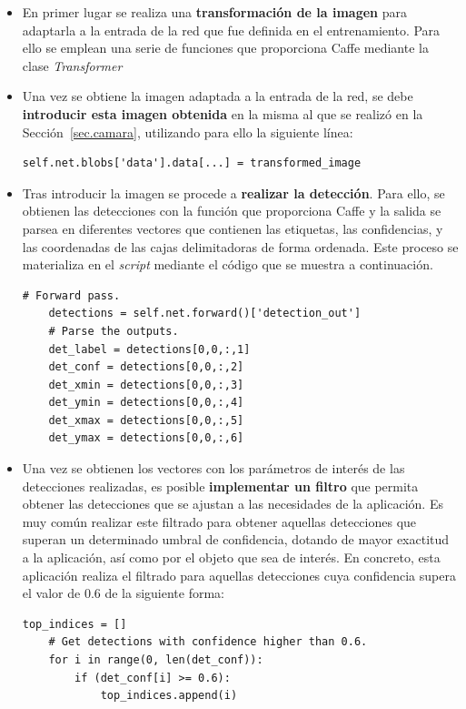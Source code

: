 \begin{itemize}
	\item En primer lugar se realiza una \textbf{transformación de la imagen} para adaptarla a la entrada de la red que fue definida en el entrenamiento. Para ello se emplean una serie de funciones que proporciona Caffe mediante la clase \textit{Transformer} 
	\item Una vez se obtiene la imagen adaptada a la entrada de la red, se debe \textbf{introducir esta imagen obtenida} en la misma al que se realizó en la Sección~\ref{sec.camara}, utilizando para ello la siguiente línea:
	\vspace{10pt}
	\begin{lstlisting}[frame=single]
	self.net.blobs['data'].data[...] = transformed_image
	\end{lstlisting}
	\item Tras introducir la imagen se procede a \textbf{realizar la detección}. Para ello, se obtienen las detecciones con la función que proporciona Caffe y la salida se parsea en diferentes vectores que contienen las etiquetas, las confidencias, y las coordenadas de las cajas delimitadoras de forma ordenada. Este proceso se materializa en el \textit{script} mediante el código que se muestra a continuación.
	\vspace{10pt}
	\begin{lstlisting}[frame=single]
	# Forward pass.
	detections = self.net.forward()['detection_out']
	# Parse the outputs.
	det_label = detections[0,0,:,1]
	det_conf = detections[0,0,:,2]
	det_xmin = detections[0,0,:,3]
	det_ymin = detections[0,0,:,4]
	det_xmax = detections[0,0,:,5]
	det_ymax = detections[0,0,:,6]
	\end{lstlisting}
	\item Una vez se obtienen los vectores con los parámetros de interés de las detecciones realizadas, es posible \textbf{implementar un filtro} que permita obtener las detecciones que se ajustan a las necesidades de la aplicación. Es muy común realizar este filtrado para obtener aquellas detecciones que superan un determinado umbral de confidencia, dotando de mayor exactitud a la aplicación, así como por el objeto que sea de interés. En concreto, esta aplicación realiza el filtrado para aquellas detecciones cuya confidencia supera el valor de 0.6 de la siguiente forma:
	\begin{lstlisting}[frame=single]
	top_indices = []
	# Get detections with confidence higher than 0.6.
	for i in range(0, len(det_conf)):
		if (det_conf[i] >= 0.6):
			top_indices.append(i)


\end{lstlisting}
\end{itemize}
